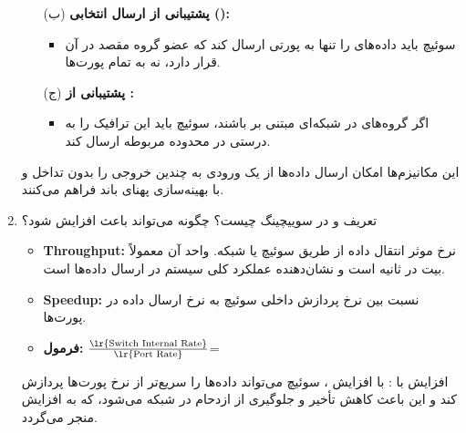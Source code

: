 	
	
	
	
	\begin{enumerate}
	
	\item [ ]
	\begin{qsolve}
		\begin{enumerate}
			\item [(ب)]
			\textbf{پشتیبانی از ارسال انتخابی ():}
			\begin{itemize}
				\item 
				سوئیچ باید داده‌های  را تنها به پورتی ارسال کند که عضو گروه مقصد در آن قرار دارد، نه به تمام پورت‌ها.
			\end{itemize}
			
			\item [(ج)]
			\textbf{پشتیبانی از :}
			\begin{itemize}
				\item 
				اگر گروه‌های  در شبکه‌ای مبتنی بر  باشند، سوئیچ باید این ترافیک را به درستی در محدوده  مربوطه ارسال کند.
			\end{itemize}
		\end{enumerate}
		
		این مکانیزم‌ها امکان ارسال داده‌ها از یک ورودی به چندین خروجی را بدون تداخل و با بهینه‌سازی پهنای باند فراهم می‌کنند.
	\end{qsolve}
	
	\item 
	تعریف  و  در سوییچینگ چیست؟ چگونه  می‌تواند باعث افزایش  شود؟
	
	\begin{qsolve}
		\begin{itemize}
			\item 
			\textbf{Throughput:} نرخ موثر انتقال داده از طریق سوئیچ یا شبکه. واحد آن معمولاً بیت در ثانیه است و نشان‌دهنده عملکرد کلی سیستم در ارسال داده‌ها است.
			
			\item 
			\textbf{Speedup:} نسبت بین نرخ پردازش داخلی سوئیچ به نرخ ارسال داده در پورت‌ها.
			
			\item 
			\textbf{فرمول:} $\frac{\text{\lr{Switch Internal Rate}}}{\text{\lr{Port Rate}}}$=\text{\lr{Speedup}}
		\end{itemize}
		
		افزایش  با : با افزایش ، سوئیچ می‌تواند داده‌ها را سریع‌تر از نرخ پورت‌ها پردازش کند و این باعث کاهش تأخیر و جلوگیری از ازدحام در شبکه می‌شود، که به افزایش  منجر می‌گردد.
	\end{qsolve}
	

\end{enumerate}
